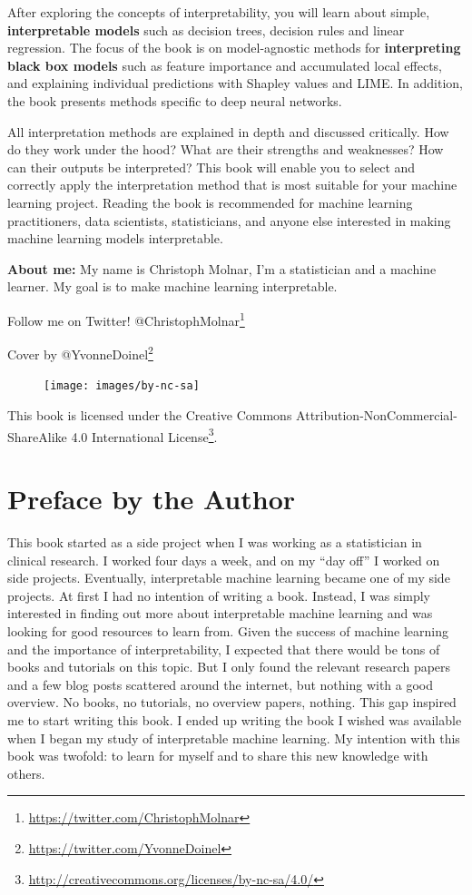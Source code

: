 \documentclass[
  10pt,
]{scrbook}
\renewcommand{\href}[2]{#2\footnote{\url{#1}}}
\begin{document}
After exploring the concepts of interpretability, you will learn about simple, \textbf{interpretable models} such as decision trees, decision rules and linear regression.
The focus of the book is on model-agnostic methods for \textbf{interpreting black box models} such as feature importance and accumulated local effects, and explaining individual predictions with Shapley values and LIME.
In addition, the book presents methods specific to deep neural networks.

All interpretation methods are explained in depth and discussed critically.
How do they work under the hood?
What are their strengths and weaknesses?
How can their outputs be interpreted?
This book will enable you to select and correctly apply the interpretation method that is most suitable for your machine learning project.
Reading the book is recommended for machine learning practitioners, data scientists, statisticians, and anyone else interested in making machine learning models interpretable.

\textbf{About me:} My name is Christoph Molnar, I'm a statistician and a machine learner.
My goal is to make machine learning interpretable.

Follow me on Twitter! \href{https://twitter.com/ChristophMolnar}{@ChristophMolnar}

Cover by \href{https://twitter.com/YvonneDoinel}{@YvonneDoinel}

\begin{figure}

{\centering \texttt{[image: images/by-nc-sa]} 

}

\end{figure}

This book is licensed under the \href{http://creativecommons.org/licenses/by-nc-sa/4.0/}{Creative Commons Attribution-NonCommercial-ShareAlike 4.0 International License}.

\hypertarget{preface-by-the-author}{%
\chapter{Preface by the Author}\label{preface-by-the-author}}

This book started as a side project when I was working as a statistician in clinical research.
I worked four days a week, and on my ``day off'' I worked on side projects.
Eventually, interpretable machine learning became one of my side projects.
At first I had no intention of writing a book.
Instead, I was simply interested in finding out more about interpretable machine learning and was looking for good resources to learn from.
Given the success of machine learning and the importance of interpretability, I expected that there would be tons of books and tutorials on this topic.
But I only found the relevant research papers and a few blog posts scattered around the internet, but nothing with a good overview.
No books, no tutorials, no overview papers, nothing.
This gap inspired me to start writing this book.
I ended up writing the book I wished was available when I began my study of interpretable machine learning.
My intention with this book was twofold: to learn for myself and to share this new knowledge with others.
\end{document}
